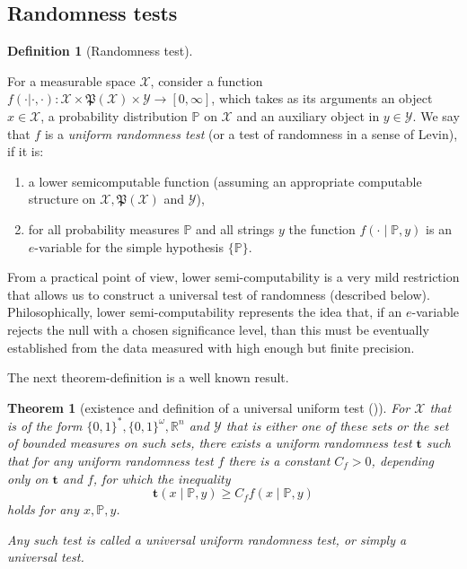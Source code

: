 \documentclass{article}
\newtheorem{theorem}{Theorem}
\theoremstyle{definition}
\theoremstyle{definition}
\newtheorem{definition}{Definition}[section]
\newcommand{\reals}{\mathbb{R}}
\newcommand{\probP}{\mathbb{P}}
\newcommand{\uut}{\mathbf{t}}
\begin{document}
\subsection{Randomness tests}

\begin{definition}[Randomness test]\label{dfn:rand-test}


For a measurable space $\mathcal{X}$, consider a function $f(\cdot | \cdot, \cdot):\mathcal{X}\times\mathfrak{P}(\mathcal{X})\times\mathcal{Y}\to[0,\infty]$, which takes as its arguments an object $x \in \mathcal{X}$, a probability distribution $\probP$ on $\mathcal{X}$ and an auxiliary object in  $y \in \mathcal{Y}$. We say that $f$ is a \emph{uniform randomness test} (or a test of randomness in a sense of Levin), if it is:
\begin{enumerate}
    \item a lower semicomputable function (assuming an appropriate computable structure on $\mathcal{X}, \mathfrak{P}(\mathcal{X})$ and $\mathcal{Y}$),
    \item for all probability measures $\probP$ and all strings $y$ the function $f(\cdot\mid \probP, y)$ is an $e$-variable for the simple hypothesis $\{\probP\}$.
\end{enumerate}
\end{definition}

From a practical point of view, lower semi-computability is a very mild restriction that allows us to construct a universal test of randomness (described below). Philosophically, lower semi-computability represents the idea that, if an $e$-variable rejects the null with a chosen significance level, than this must be eventually established from the data measured with high enough but finite precision.

The next theorem-definition is a well known result.

\begin{theorem}[existence and definition of a universal uniform test (\cite{levin1976uniform, GACS200591, VovkVyuginBayes})]
For $\mathcal{X}$ that is of the form $\{0,1\}^*, \{0,1\}^\omega, \reals^n$ and $\mathcal{Y}$ that is either one of these sets or the set of bounded measures on such sets, there exists a uniform randomness test $\uut$ such that for any uniform randomness test $f$ there is a constant $C_f >0$, depending only on $\uut$ and $f$, for which the inequality
\[
    \uut(x\mid \probP, y) \ge C_f f(x\mid \probP, y)
\]
holds for any $x, \probP, y$.

Any such test is called a \emph{universal uniform randomness test}, or simply a \emph{universal test}.
\end{theorem}
\end{document}

